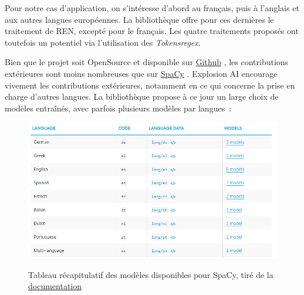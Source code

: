 Pour notre cas d'application, on s'intéresse d'abord au français, puis à l'anglais et aux autres langues européennes. La bibliothèque offre pour ces dernières le traitement de REN, excepté pour le français. Les quatre traitements proposés ont toutefois un potentiel via l'utilisation des \textit{Tokensregex}.
\newline

Bien que le projet soit OpenSource et disponible sur \href{https://github.com/stanfordnlp/CoreNLP}{Github} \cite{corenlp-repo}, les contributions extérieures sont moins nombreuses que sur \href{https://github.com/explosion/spaCy}{SpaCy} \cite{spacy-repo}. Explosion AI encourage vivement les contributions extérieures, notamment en ce qui concerne la prise en charge d'autres langues. La bibliothèque propose à ce jour un large choix de modèles entraînés, avec parfois plusieurs modèles par langues~:
 \vspace{10pt}
\begin{figure}[H]
    \centering
    \includegraphics[scale=0.7]{images/spacy-lang.png}
    \caption{Tableau récapitulatif des modèles disponibles pour SpaCy, tiré de la \href{https://spacy.io/usage/models}{documentation}} \cite{spacy-lang}
    \label{fig:spacy-lang}
\end{figure}
\vspace{10pt}

